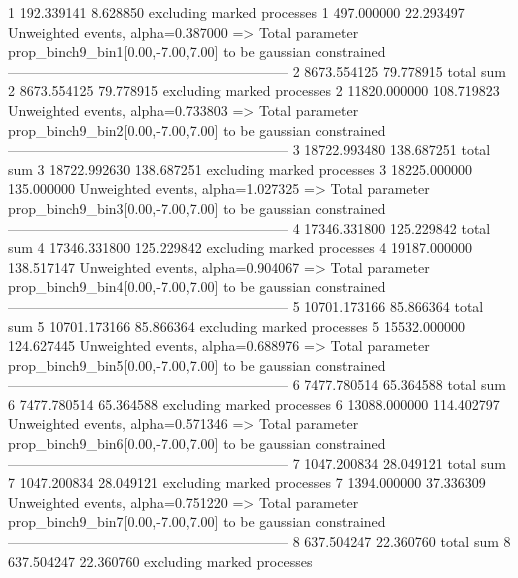 1          192.339141      8.628850        excluding marked processes    
1          497.000000      22.293497       Unweighted events, alpha=0.387000
  => Total parameter prop_binch9_bin1[0.00,-7.00,7.00] to be gaussian constrained
------------------------------------------------------------
2          8673.554125     79.778915       total sum                     
2          8673.554125     79.778915       excluding marked processes    
2          11820.000000    108.719823      Unweighted events, alpha=0.733803
  => Total parameter prop_binch9_bin2[0.00,-7.00,7.00] to be gaussian constrained
------------------------------------------------------------
3          18722.993480    138.687251      total sum                     
3          18722.992630    138.687251      excluding marked processes    
3          18225.000000    135.000000      Unweighted events, alpha=1.027325
  => Total parameter prop_binch9_bin3[0.00,-7.00,7.00] to be gaussian constrained
------------------------------------------------------------
4          17346.331800    125.229842      total sum                     
4          17346.331800    125.229842      excluding marked processes    
4          19187.000000    138.517147      Unweighted events, alpha=0.904067
  => Total parameter prop_binch9_bin4[0.00,-7.00,7.00] to be gaussian constrained
------------------------------------------------------------
5          10701.173166    85.866364       total sum                     
5          10701.173166    85.866364       excluding marked processes    
5          15532.000000    124.627445      Unweighted events, alpha=0.688976
  => Total parameter prop_binch9_bin5[0.00,-7.00,7.00] to be gaussian constrained
------------------------------------------------------------
6          7477.780514     65.364588       total sum                     
6          7477.780514     65.364588       excluding marked processes    
6          13088.000000    114.402797      Unweighted events, alpha=0.571346
  => Total parameter prop_binch9_bin6[0.00,-7.00,7.00] to be gaussian constrained
------------------------------------------------------------
7          1047.200834     28.049121       total sum                     
7          1047.200834     28.049121       excluding marked processes    
7          1394.000000     37.336309       Unweighted events, alpha=0.751220
  => Total parameter prop_binch9_bin7[0.00,-7.00,7.00] to be gaussian constrained
------------------------------------------------------------
8          637.504247      22.360760       total sum                     
8          637.504247      22.360760       excluding marked processes    
